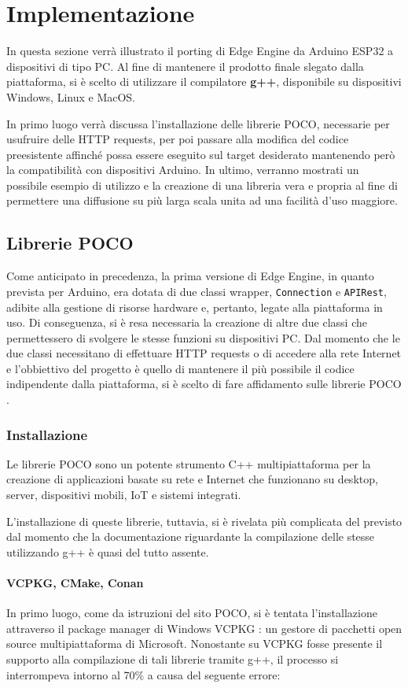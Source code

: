 \chapter{Implementazione}
In questa sezione verrà illustrato il porting di Edge Engine da Arduino ESP32 a dispositivi di tipo PC. Al fine di mantenere il prodotto finale slegato dalla piattaforma, si è scelto di utilizzare il compilatore \textbf{g++}, disponibile su dispositivi Windows, Linux e MacOS.

In primo luogo verrà discussa l’installazione delle librerie POCO, necessarie per usufruire delle HTTP requests, per poi passare alla modifica del codice preesistente affinché possa essere eseguito sul target desiderato mantenendo però la compatibilità con dispositivi Arduino. In ultimo, verranno mostrati un possibile esempio di utilizzo e la creazione di una libreria vera e propria al fine di permettere una diffusione su più larga scala unita ad una facilità d'uso maggiore.
\section{Librerie POCO}
Come anticipato in precedenza, la prima versione di Edge Engine, in quanto prevista per Arduino, era dotata di due classi wrapper, \texttt{Connection} e \texttt{APIRest}, adibite alla gestione di risorse hardware e, pertanto, legate alla piattaforma in uso. Di conseguenza, si è resa necessaria la creazione di altre due classi che permettessero di svolgere le stesse funzioni su dispositivi PC. Dal momento che le due classi necessitano di effettuare HTTP requests o di accedere alla rete Internet e l’obbiettivo del progetto è quello di mantenere il più possibile il codice indipendente dalla piattaforma, si è scelto di fare affidamento sulle librerie POCO \cite{POCO}.
\subsection{Installazione}
Le librerie POCO sono un potente strumento C++ multipiattaforma per la creazione di applicazioni basate su rete e Internet che funzionano su desktop, server, dispositivi mobili, IoT e sistemi integrati.

L’installazione di queste librerie, tuttavia, si è rivelata più complicata del previsto dal momento che la documentazione riguardante la compilazione delle stesse utilizzando g++ è quasi del tutto assente.

\subsubsection{VCPKG, CMake, Conan}
In primo luogo, come da istruzioni del sito POCO, si è tentata l’installazione attraverso il package manager di Windows VCPKG \cite{VCPKG}: un gestore di pacchetti open source multipiattaforma di Microsoft. Nonostante su VCPKG fosse presente il supporto alla compilazione di tali librerie tramite g++, il processo si interrompeva intorno al 70\% a causa del seguente errore:

